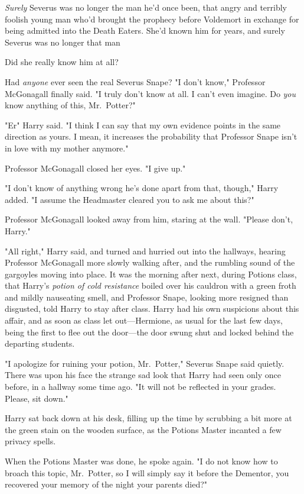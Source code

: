 \emph{Surely} Severus was no longer the man he'd once been, that angry and
terribly foolish young man who'd brought the prophecy before Voldemort in
exchange for being admitted into the Death Eaters. She'd known him for years,
and surely Severus was no longer that man{\el}

Did she really know him at all?

Had \emph{anyone} ever seen the real Severus Snape?
\sbreak
"I don't know," Professor McGonagall finally said. "I truly don't know at all.
I can't even imagine. Do \emph{you} know anything of this, Mr.~Potter?"

"Er{\el}" Harry said. "I think I can say that my own evidence points in the
same direction as yours. I mean, it increases the probability that Professor
Snape isn't in love with my mother anymore."

Professor McGonagall closed her eyes. "I give up."

"I don't know of anything wrong he's done apart from that, though," Harry
added. "I assume the Headmaster cleared you to ask me about this?"

Professor McGonagall looked away from him, staring at the wall. "Please don't,
Harry."

"All right," Harry said, and turned and hurried out into the hallways, hearing
Professor McGonagall more slowly walking after, and the rumbling sound of the
gargoyles moving into place.
\sbreak
It was the morning after next, during Potions class, that Harry's \emph{potion
of cold resistance} boiled over his cauldron with a green froth and mildly
nauseating smell, and Professor Snape, looking more resigned than disgusted,
told Harry to stay after class. Harry had his own suspicions about this affair,
and as soon as class let out—Hermione, as usual for the last few days, being
the first to flee out the door—the door swung shut and locked behind the
departing students.

"I apologize for ruining your potion, Mr.~Potter," Severus Snape said quietly.
There was upon his face the strange sad look that Harry had seen only once
before, in a hallway some time ago. "It will not be reflected in your grades.
Please, sit down."

Harry sat back down at his desk, filling up the time by scrubbing a bit more at
the green stain on the wooden surface, as the Potions Master incanted a few
privacy spells.

When the Potions Master was done, he spoke again. "I{\el} do not know how to
broach this topic, Mr.~Potter, so I will simply say it{\el} before the
Dementor, you recovered your memory of the night your parents died?"

